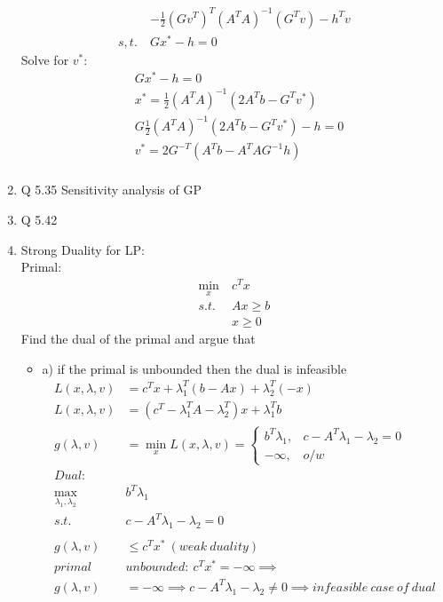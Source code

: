 \documentclass[12pt,letter]{article}
\begin{document}
\begin{enumerate}
\begin{align*}
    &-\frac{1}{2}(Gv^T)^T(A^TA)^{-1}(G^Tv) -h^Tv\\
    s,t.\ & Gx^*-h=0
  \end{align*}
  Solve for $v^*$:\\
  \begin{align*}
    &Gx^*-h=0\\
    &x^* = \frac{1}{2}(A^TA)^{-1}(2A^Tb - G^Tv^*)\\
    &G\frac{1}{2}(A^TA)^{-1}(2A^Tb - G^Tv^*)-h=0\\
    &v^*=2G^{-T}(A^Tb-A^TAG^{-1}h)\\
  \end{align*}
  \pagebreak
\item Q 5.35 Sensitivity analysis of GP\\
  \pagebreak
\item Q 5.42 \\
  \pagebreak
\item Strong Duality for LP:\\
  Primal:
  \begin{align*}
    \min_x\ & c^Tx\\
    s.t.\ & Ax \geq b\\
           & x \geq 0
  \end{align*}
  Find the dual of the primal and argue that
  \begin{itemize}
  \item a) if the primal is unbounded then the dual is infeasible
    \begin{align*}
      L(x,\lambda,v) &= c^Tx + \lambda_1^T(b-Ax) + \lambda_2^T(-x)\\
      L(x,\lambda,v) &= (c^T-\lambda_1^TA -\lambda_2^T)x + \lambda_1^Tb\\
      g(\lambda,v) &= \min_x L(x,\lambda,v) =
      \begin{cases}
        b^T\lambda_1, & c -A^T\lambda_1-\lambda_2 = 0\\
        -\infty, & o/w
      \end{cases}\\
      Dual:\\
      \max_{\lambda_1,\lambda_2}\ & b^T\lambda_1\\
      s.t.\ & c - A^T\lambda_1 - \lambda_2 = 0\\
      \\
      g(\lambda,v) &\leq c^Tx^*\ (weak\ duality)\\
      primal\ & unbounded:\ c^Tx^*= -\infty \implies\\
      g(\lambda,v) &= -\infty \implies c -A^T\lambda_1-\lambda_2 \neq 0 \implies infeasible\ case\ of\ dual

\end{align*}
\end{itemize}
\end{enumerate}
\end{document}
